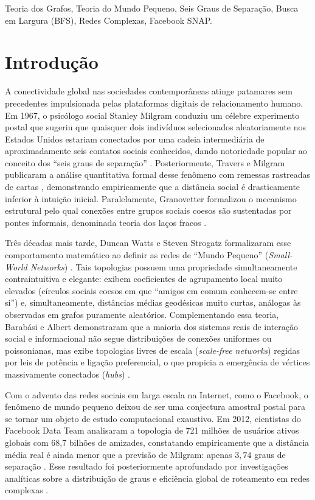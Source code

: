 \documentclass[conference]{IEEEtran}
\begin{document}
\begin{IEEEkeywords}
Teoria dos Grafos, Teoria do Mundo Pequeno, Seis Graus de Separação, Busca em Largura (BFS), Redes Complexas, Facebook SNAP.
\end{IEEEkeywords}

\section{Introdução}

A conectividade global nas sociedades contemporâneas atinge patamares sem precedentes impulsionada pelas plataformas digitais de relacionamento humano. Em 1967, o psicólogo social Stanley Milgram conduziu um célebre experimento postal que sugeriu que quaisquer dois indivíduos selecionados aleatoriamente nos Estados Unidos estariam conectados por uma cadeia intermediária de aproximadamente seis contatos sociais conhecidos, dando notoriedade popular ao conceito dos ``seis graus de separação'' \cite{milgram1967small}. Posteriormente, Travers e Milgram publicaram a análise quantitativa formal desse fenômeno com remessas rastreadas de cartas \cite{travers1969experimental}, demonstrando empiricamente que a distância social é drasticamente inferior à intuição inicial. Paralelamente, Granovetter formalizou o mecanismo estrutural pelo qual conexões entre grupos sociais coesos são sustentadas por pontes informais, denominada teoria dos laços fracos \cite{granovetter1973strength}.

Três décadas mais tarde, Duncan Watts e Steven Strogatz formalizaram esse comportamento matemático ao definir as redes de ``Mundo Pequeno'' (\textit{Small-World Networks}) \cite{watts1998collective}. Tais topologias possuem uma propriedade simultaneamente contraintuitiva e elegante: exibem coeficientes de agrupamento local muito elevados (círculos sociais coesos em que ``amigos em comum conhecem-se entre si'') e, simultaneamente, distâncias médias geodésicas muito curtas, análogas às observadas em grafos puramente aleatórios. Complementando essa teoria, Barabási e Albert demonstraram que a maioria dos sistemas reais de interação social e informacional não segue distribuições de conexões uniformes ou poissonianas, mas exibe topologias livres de escala (\textit{scale-free networks}) regidas por leis de potência e ligação preferencial, o que propicia a emergência de vértices massivamente conectados (\textit{hubs}) \cite{barabasi1999emergence}.

Com o advento das redes sociais em larga escala na Internet, como o Facebook, o fenômeno de mundo pequeno deixou de ser uma conjectura amostral postal para se tornar um objeto de estudo computacional exaustivo. Em 2012, cientistas do Facebook Data Team analisaram a topologia de 721 milhões de usuários ativos globais com 68,7 bilhões de amizades, constatando empiricamente que a distância média real é ainda menor que a previsão de Milgram: apenas $3,74$ graus de separação \cite{backstrom2012four}. Esse resultado foi posteriormente aprofundado por investigações analíticas sobre a distribuição de graus e eficiência global de roteamento em redes complexas \cite{ugander2011anatomy,latora2001efficient,newman2003structure}.
\end{document}
